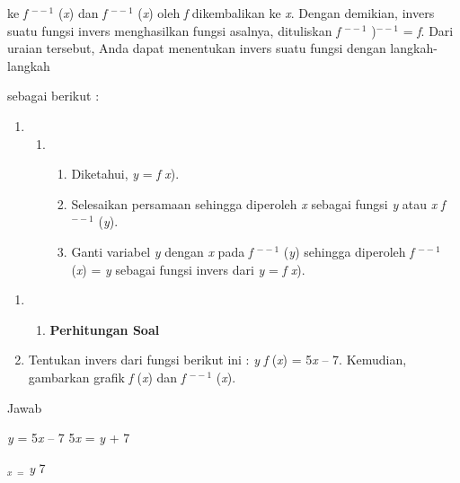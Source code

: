 \documentclass[11pt,fleqn]{book} %
\begin{document}
\begin{myEnumerate}
\begin{itemize}
\noindent ke \textit{f} ${}^{--1}$ (\textit{x}) dan \textit{f }${}^{--1}$\textit{ }(\textit{x})\textit{ }oleh\textit{ f }dikembalikan ke\textit{ x}. Dengan demikian,\textit{ }invers\textit{ }suatu fungsi invers menghasilkan fungsi asalnya, dituliskan \textit{f }${}^{--1}$\textit{ })${}^{--1}$\textit{ }=\textit{ f}. Dari uraian tersebut, Anda dapat menentukan\textit{ }invers\textit{ }suatu fungsi dengan langkah-langkah 

\noindent sebagai berikut :

\begin{enumerate}
\item \begin{enumerate}
\item \begin{enumerate}
\item  Diketahui, \textit{y} = \textit{f} \textit{x}).

\item  Selesaikan persamaan sehingga diperoleh \textit{x} sebagai fungsi \textit{y} atau \textit{x} \textit{f }${}^{--1}$\textit{ }(\textit{y}).

\item  Ganti variabel \textit{y} dengan \textit{x} pada \textit{f} ${}^{--1}$ (\textit{y}) sehingga diperoleh \textit{f }${}^{--1}$\textit{ }(\textit{x})\textit{ }=\textit{ y }sebagai\textit{ }fungsi invers dari\textit{ y }=\textit{ f x}).
\end{enumerate}
\end{enumerate}
\end{enumerate}

\noindent 

\begin{enumerate}
\item \begin{enumerate}
\item  \textbf{Perhitungan Soal}
\end{enumerate}

\item \textbf{ }Tentukan invers dari fungsi berikut ini : \textit{y} \textit{f }(\textit{x})\textit{ }= 5\textit{x }-- 7. Kemudian, gambarkan grafik \textit{f} (\textit{x}) dan \textit{f} ${}^{--1}$ (\textit{x}).
\end{enumerate}

\noindent        Jawab

\noindent \textit{y }=\textit{ }5\textit{x }-- 7 5\textit{x} = \textit{y} + 7

\noindent \textit{${}_{x}$ }${}_{=}$\textit{ y  }7


\end{itemize}
\end{myEnumerate}
\end{document}
